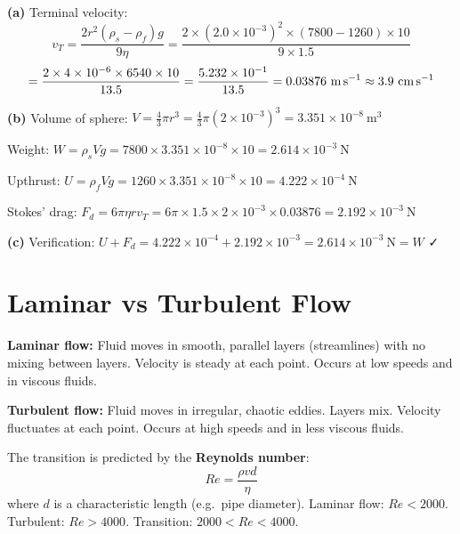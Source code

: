 \begin{solutionbox}
\textbf{(a)} Terminal velocity:
\[
  v_T = \frac{2r^2(\rho_s-\rho_f)g}{9\eta}
  = \frac{2 \times (2.0\times10^{-3})^2
    \times (7800-1260) \times 10}
    {9 \times 1.5}
\]
\[
  = \frac{2 \times 4\times10^{-6} \times 6540 \times 10}
    {13.5}
  = \frac{5.232\times10^{-1}}{13.5}
  = 0.03876\ \text{m\,s}^{-1}
  \approx 3.9\ \text{cm\,s}^{-1}
\]

\textbf{(b)} Volume of sphere:
$V = \frac{4}{3}\pi r^3
= \frac{4}{3}\pi(2\times10^{-3})^3
= 3.351\times10^{-8}\ \text{m}^3$

Weight:
$W = \rho_s V g = 7800 \times 3.351\times10^{-8} \times 10
= 2.614\times10^{-3}\ \text{N}$

Upthrust:
$U = \rho_f V g = 1260 \times 3.351\times10^{-8} \times 10
= 4.222\times10^{-4}\ \text{N}$

Stokes' drag:
$F_d = 6\pi\eta r v_T
= 6\pi \times 1.5 \times 2\times10^{-3} \times 0.03876
= 2.192\times10^{-3}\ \text{N}$

\textbf{(c)} Verification:
$U + F_d = 4.222\times10^{-4} + 2.192\times10^{-3}
= 2.614\times10^{-3}\ \text{N} = W$ ✓
\end{solutionbox}

\section{Laminar vs Turbulent Flow}

\begin{definitionbox}
\textbf{Laminar flow:} Fluid moves in smooth,
parallel layers (streamlines) with no mixing between
layers. Velocity is steady at each point. Occurs at
low speeds and in viscous fluids.

\vspace{0.4cm}

\textbf{Turbulent flow:} Fluid moves in irregular,
chaotic eddies. Layers mix. Velocity fluctuates at
each point. Occurs at high speeds and in less viscous
fluids.

The transition is predicted by the
\textbf{Reynolds number}:
\[
  Re = \frac{\rho v d}{\eta}
\]
where $d$ is a characteristic length (e.g.\ pipe
diameter). Laminar flow: $Re < 2000$. Turbulent:
$Re > 4000$. Transition: $2000 < Re < 4000$.
\end{definitionbox}

